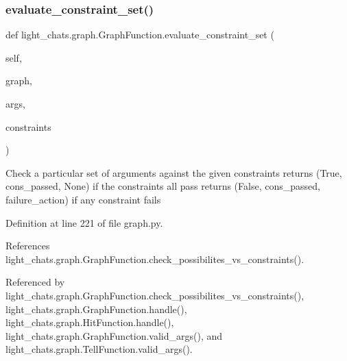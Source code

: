 \subsubsection{\texorpdfstring{evaluate\+\_\+constraint\+\_\+set()}{evaluate\_constraint\_set()}}
{\footnotesize\ttfamily def light\+\_\+chats.\+graph.\+Graph\+Function.\+evaluate\+\_\+constraint\+\_\+set (\begin{DoxyParamCaption}\item[{}]{self,  }\item[{}]{graph,  }\item[{}]{args,  }\item[{}]{constraints }\end{DoxyParamCaption})}

\begin{DoxyVerb}Check a particular set of arguments against the given constraints
returns (True, cons_passed, None) if the constraints all pass
returns (False, cons_passed, failure_action) if any constraint fails
\end{DoxyVerb}
 

Definition at line 221 of file graph.\+py.



References light\+\_\+chats.\+graph.\+Graph\+Function.\+check\+\_\+possibilites\+\_\+vs\+\_\+constraints().



Referenced by light\+\_\+chats.\+graph.\+Graph\+Function.\+check\+\_\+possibilites\+\_\+vs\+\_\+constraints(), light\+\_\+chats.\+graph.\+Graph\+Function.\+handle(), light\+\_\+chats.\+graph.\+Hit\+Function.\+handle(), light\+\_\+chats.\+graph.\+Graph\+Function.\+valid\+\_\+args(), and light\+\_\+chats.\+graph.\+Tell\+Function.\+valid\+\_\+args().


